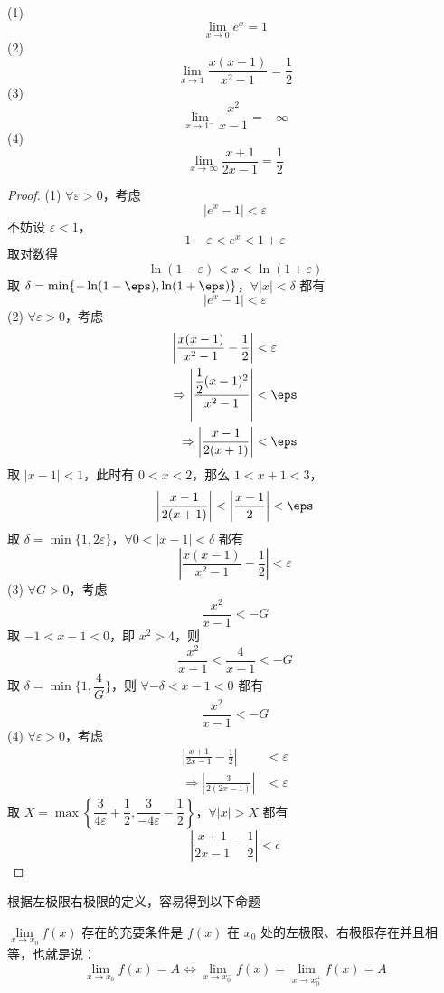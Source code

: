 \begin{example}
	(1)  $$\lim_{x \to 0} e^x = 1$$
	(2)$$\lim_{x \to 1} \frac{x(x-1)}{x^2-1} = \frac{1}{2}$$
	(3)$$\lim_{x \to 1^-} \frac{x^2}{x-1} = -\infty$$
	(4) $$\lim_{x \to \infty} \frac{x+1}{2x-1} = \frac{1}{2}$$
\end{example}
\begin{proof}
	(1) $\forall \varepsilon > 0$，考虑
	\[
	|e^x - 1| < \varepsilon
	\]
	不妨设 $\varepsilon < 1$，
	\[
	1 - \varepsilon < e^x < 1 + \varepsilon
	\]
	取对数得
	\[
	\ln(1 - \varepsilon) < x < \ln(1 + \varepsilon)
	\]
	取 $\delta = \min\{-\ln(1 - \eps), \ln(1 + \eps)\}$，$\forall |x| < \delta$ 都有
	\[
	|e^x - 1| < \varepsilon
	\]
	(2) $\forall \varepsilon > 0$，考虑
	$$\begin{aligned}
		\left|\dfrac{x(x-1)}{x^2-1} - \dfrac{1}{2}\right| &< \varepsilon\\
		\Rightarrow \left|\dfrac{\dfrac{1}{2}(x-1)^2}{x^2-1}\right| &< \eps\\
		\Rightarrow \left|\dfrac{x-1}{2(x+1)}\right| &< \eps
	\end{aligned}$$
	取 $|x-1| < 1$，此时有 $0 < x < 2$，那么 $1 < x+1 < 3$，
	\[
	\left|\dfrac{x-1}{2(x+1)}\right| < \left|\dfrac{x-1}{2}\right| < \eps
	\]
	取 $\delta = \min\{1, 2\varepsilon\}$，$\forall 0 < |x-1| < \delta$ 都有
	\[
	\left|\dfrac{x(x-1)}{x^2-1} - \dfrac{1}{2}\right| < \varepsilon
	\]
	(3) $\forall G > 0$，考虑
	\[
	\frac{x^2}{x-1} < -G
	\]
	取 $-1 < x-1 < 0$，即 $x^2 > 4$，则
	\[
	\frac{x^2}{x-1} < \frac{4}{x-1} < -G
	\]
	取 $\delta = \min\{1, \dfrac{4}{G}\}$，则 $\forall -\delta < x-1 < 0$ 都有
	\[
	\frac{x^2}{x-1} < -G
	\]
	(4) $\forall \varepsilon > 0$，考虑
	$$\begin{aligned}
		\left|\frac{x+1}{2x-1} - \frac{1}{2}\right| &< \varepsilon\\
		\Rightarrow \left|\frac{3}{2(2x-1)}\right| &< \varepsilon
	\end{aligned}$$
	取 $X = \max\left\{\dfrac{3}{4\varepsilon} + \dfrac{1}{2}, \dfrac{3}{-4\varepsilon} - \dfrac{1}{2}\right\}$，$\forall |x| > X$ 都有
	\[
	\left|\frac{x+1}{2x-1} - \frac{1}{2}\right| < \epsilon
	\]
\end{proof}
根据左极限右极限的定义，容易得到以下命题
\begin{proposition}
	$\lim\limits_{x \to x_0} f(x)$ 存在的充要条件是 $f(x)$ 在 $x_0$ 处的左极限、右极限存在并且相等，也就是说：
	\[
	\lim_{x \to x_0} f(x) = A \iff \lim_{x \to x_0^-} f(x) = \lim_{x \to x_0^+} f(x) = A
	\]
\end{proposition}
